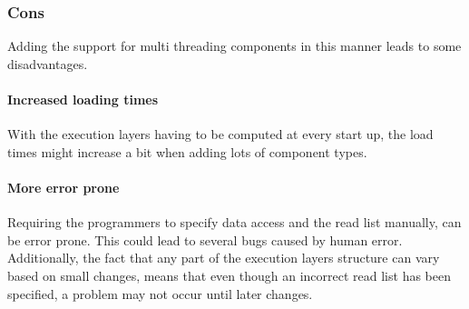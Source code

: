\subsubsection{Cons}
Adding the support for multi threading components in this manner leads to some disadvantages.

\paragraph{Increased loading times}
With the execution layers having to be computed at every start up, the load times might increase a bit when adding lots of component types.

\paragraph{More error prone}
Requiring the programmers to specify data access and the read list manually, can be error prone. This could lead to several bugs caused by human error.
Additionally, the fact that any part of the execution layers structure can vary based on small changes, means that even though an incorrect read list has been specified, a problem may not occur until later changes.
